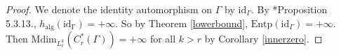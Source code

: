 \documentclass[a4paper,11pt,reqno]{amsart}
\theoremstyle{plain}
\newtheorem{prop}[thm]{Proposition}
\theoremstyle{mainthmstyle}
\theoremstyle{named}
\numberwithin{equation}{section}
\begin{document}
\begin{proof}
    We denote the identity automorphism on $\Gamma$ by $\mathrm{id}_{\Gamma}$. By  \cite{Dikranjan2013TopologicalEA}*{Proposition 5.3.13.}, $h_{\mathrm{alg}}(\mathrm{id_{\Gamma}})=+\infty$. So by Theorem \ref{lowerbound}, $\mathrm{Entp}(\mathrm{id}_{\Gamma})=+\infty$. Then  $\mathrm{Mdim}_{L^{k}_{\ell}}(C^{\ast}_{r}(\Gamma))=+\infty$ for all $k>r$ by Corollary \ref{innerzero}. 
\end{proof}
\end{document}
